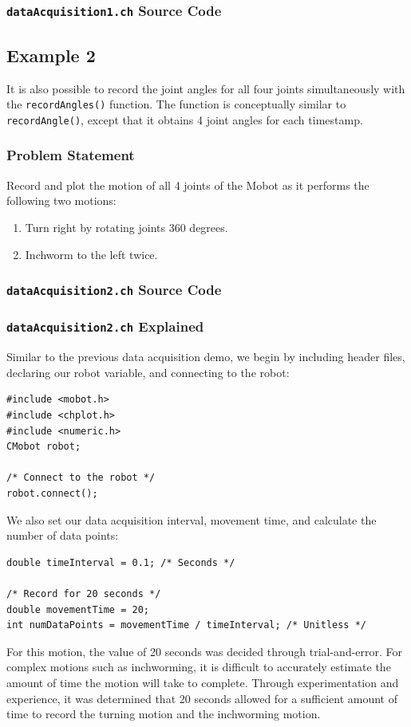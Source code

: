 \documentclass{article}
\begin{document}
\subsubsection{\texttt{dataAcquisition1.ch} Source Code}


\subsection{Example 2}
It is also possible to record the joint angles for all four joints simultaneously
with the \texttt{recordAngles()} function. The function is conceptually similar
to \texttt{recordAngle()}, except that it obtains 4 joint angles for each timestamp.

\subsubsection{Problem Statement}
Record and plot the motion of all 4 joints of the Mobot as it performs the
following two motions:
\begin{enumerate}
\item Turn right by rotating joints 360 degrees.
\item Inchworm to the left twice.
\end{enumerate}

\subsubsection{\texttt{dataAcquisition2.ch} Source Code}


\subsubsection{\texttt{dataAcquisition2.ch} Explained}
Similar to the previous data acquisition demo, we begin by including
header files, declaring our robot variable, and connecting to the robot:
\begin{verbatim}
#include <mobot.h>
#include <chplot.h>
#include <numeric.h>
CMobot robot;

/* Connect to the robot */
robot.connect();
\end{verbatim}

We also set our data acquisition interval, movement time, and calculate
the number of data points:
\begin{verbatim}
double timeInterval = 0.1; /* Seconds */

/* Record for 20 seconds */
double movementTime = 20;
int numDataPoints = movementTime / timeInterval; /* Unitless */
\end{verbatim}
For this motion, the value of 20 seconds was decided through trial-and-error.
For complex motions such as inchworming, it is difficult to accurately estimate the 
amount of time the motion will take to complete. Through experimentation and experience,
it was determined that 20 seconds allowed for a sufficient amount of time to record the 
turning motion and the inchworming motion. 
\end{document}

